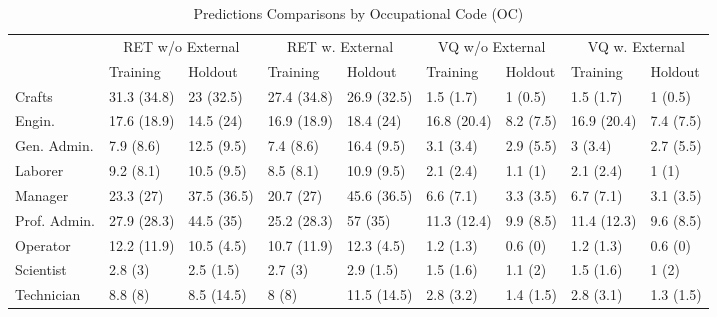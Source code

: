 \documentclass[12pt,letterpaper]{article}
\begin{document}
\begin{table}[h!]
	\centering
	\scriptsize
	\smallskip
	\caption{Predictions Comparisons by Occupational Code (OC)}
	\begin{threeparttable}
		    \begin{tabular}{lllllllll}
		    	\toprule
		    	& \multicolumn{2}{c}{RET w/o External} & \multicolumn{2}{c}{RET w. External} & \multicolumn{2}{c}{VQ w/o External} & \multicolumn{2}{c}{VQ w. External} \\
		    	
		    	& Training & Holdout & Training & Holdout & Training & Holdout & Training & Holdout \\ \midrule
		    	Crafts  & 31.3\tnote{1} (34.8)\tnote{2} & 23 (32.5) & 27.4 (34.8) & 26.9 (32.5) & 1.5 (1.7) & 1 (0.5) & 1.5 (1.7) & 1 (0.5) \\
		    	Engin.    & 17.6 (18.9) & 14.5 (24) & 16.9 (18.9) & 18.4 (24) & 16.8 (20.4) & 8.2 (7.5) & 16.9 (20.4) & 7.4 (7.5) \\
		    	Gen. Admin. & 7.9 (8.6) & 12.5 (9.5) & 7.4 (8.6) & 16.4 (9.5) & 3.1 (3.4) & 2.9 (5.5) & 3 (3.4) & 2.7 (5.5) \\
		    	Laborer     & 9.2 (8.1) & 10.5 (9.5) & 8.5 (8.1) & 10.9 (9.5) & 2.1 (2.4) & 1.1 (1) & 2.1 (2.4) & 1 (1) \\
		    	Manager     & 23.3 (27) & 37.5 (36.5) & 20.7 (27) & 45.6 (36.5) & 6.6 (7.1) & 3.3 (3.5) & 6.7 (7.1) & 3.1 (3.5) \\
		    	Prof. Admin.     & 27.9 (28.3) & 44.5 (35) & 25.2 (28.3) & 57 (35) & 11.3 (12.4) & 9.9 (8.5) & 11.4 (12.3) & 9.6 (8.5) \\
		    	Operator     & 12.2 (11.9) & 10.5 (4.5) & 10.7 (11.9) & 12.3 (4.5) & 1.2 (1.3) & 0.6 (0) & 1.2 (1.3) & 0.6 (0) \\
		    	Scientist     & 2.8 (3) & 2.5 (1.5) & 2.7 (3) & 2.9 (1.5) & 1.5 (1.6) & 1.1 (2) & 1.5 (1.6) & 1 (2) \\
		    	Technician     & 8.8 (8) & 8.5 (14.5) & 8 (8) & 11.5 (14.5) & 2.8 (3.2) & 1.4 (1.5) & 2.8 (3.1) & 1.3 (1.5) \\
		    	\bottomrule
		    \end{tabular}%
		

\end{threeparttable}
\end{table}
\end{document}
